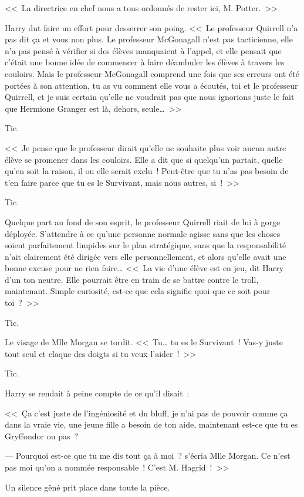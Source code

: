 <<~La directrice en chef nous a tous ordonnés de rester ici, M. Potter.~>>

Harry dut faire un effort pour desserrer son poing. <<~Le professeur Quirrell n'a pas dit ça et vous non plus. Le professeur McGonagall n'est pas tacticienne, elle n'a pas pensé à vérifier si des élèves manquaient à l'appel, et elle pensait que c'était une bonne idée de commencer à faire déambuler les élèves à travers les couloirs. Mais le professeur McGonagall comprend une fois que ses erreurs ont été portées à son attention, tu as vu comment elle vous a écoutés, toi et le professeur Quirrell, et je suis certain qu'elle ne voudrait pas que nous ignorions juste le fait que Hermione Granger est là, dehors, seule…~>>

Tic.

<<~Je pense que le professeur dirait qu'elle ne souhaite plus voir aucun autre élève se promener dans les couloirs. Elle a dit que si quelqu'un partait, quelle qu'en soit la raison, il ou elle serait exclu~! Peut-être que tu n'as pas besoin de t'en faire parce que tu es le Survivant, mais nous autres, si~!~>>

Tic.

Quelque part au fond de son esprit, le professeur Quirrell riait de lui à gorge déployée. S'attendre à ce qu'une personne normale agisse sans que les choses soient parfaitement limpides sur le plan stratégique, sans que la responsabilité n'ait clairement été dirigée vers elle personnellement, et alors qu'elle avait une bonne excuse pour ne rien faire… <<~La vie d'une élève est en jeu, dit Harry d'un ton neutre. Elle pourrait être en train de se battre contre le troll, maintenant. Simple curiosité, est-ce que cela signifie quoi que ce soit pour toi~?~>>

Tic.

Le visage de Mlle Morgan se tordit. <<~Tu… tu es le Survivant~! Vas-y juste tout seul et claque des doigts si tu veux l'aider~!~>>

Tic.

Harry se rendait à peine compte de ce qu'il disait~:

<<~Ça c'est juste de l'ingéniosité et du bluff, je n'ai pas de pouvoir comme ça dans la vraie vie, une jeune fille a besoin de ton aide, maintenant est-ce que tu es Gryffondor ou pas~?

--- Pourquoi est-ce que tu me dis tout ça à moi~? s'écria Mlle Morgan. Ce n'est pas moi qu'on a nommée responsable~! C'est M. Hagrid~!~>>

Un silence gêné prit place dans toute la pièce.

